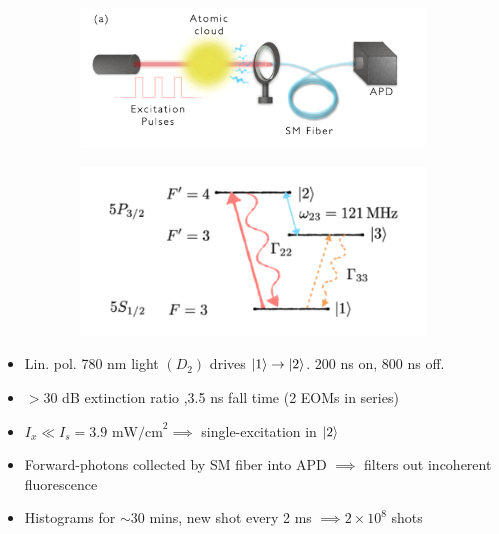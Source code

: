 \documentclass{beamer}
\theoremstyle{definition}
\begin{document}
\begin{frame}
	
	
	\begin{figure}[!htb]
		\begin{subfigure}{0.55\textwidth}
			\includegraphics[width=\textwidth]{experiment.png}
		\end{subfigure}
		\begin{subfigure}{0.44\textwidth}
			\includegraphics[width=\textwidth]{Rb85_levels.png}
		\end{subfigure}
	\end{figure}
	
\begin{itemize}
	\item Lin. pol. 780 nm light $(D_2)$ drives $\ket{1}\to \ket{2}$. 200 ns on, 800 ns off.  
	\item $> 30$ dB extinction ratio ,3.5 ns fall time (2 EOMs in series)
	\item $I_x \ll I_s = 3.9 \text{ mW/cm}^2 \implies$ single-excitation in $\ket{2}$
	\item Forward-photons collected by SM fiber into APD $\implies$ filters out incoherent fluorescence
	\item Histograms for $\sim$30 mins, new shot every 2 ms $\implies 2\times 10^8$ shots 
	
\end{itemize}
\end{frame}
\end{document}
